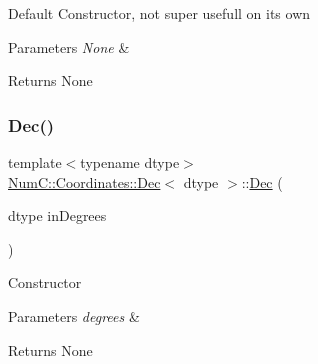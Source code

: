 Default Constructor, not super usefull on its own


\begin{DoxyParams}{Parameters}
{\em None} & \\
\hline
\end{DoxyParams}
\begin{DoxyReturn}{Returns}
None 
\end{DoxyReturn}
\mbox{\label{class_num_c_1_1_coordinates_1_1_dec_ab8907d7ea5bc9204aaef40371270be03}} 
\subsubsection{\texorpdfstring{Dec()}{Dec()}\hspace{0.1cm}{\footnotesize\ttfamily [2/3]}}
{\footnotesize\ttfamily template$<$typename dtype$>$ \\
\mbox{\hyperlink{class_num_c_1_1_coordinates_1_1_dec}{Num\+C\+::\+Coordinates\+::\+Dec}}$<$ dtype $>$\+::\mbox{\hyperlink{class_num_c_1_1_coordinates_1_1_dec}{Dec}} (\begin{DoxyParamCaption}\item[{dtype}]{in\+Degrees }\end{DoxyParamCaption})\hspace{0.3cm}{\ttfamily [inline]}}

Constructor


\begin{DoxyParams}{Parameters}
{\em degrees} & \\
\hline
\end{DoxyParams}
\begin{DoxyReturn}{Returns}
None 
\end{DoxyReturn}
\mbox{\label{class_num_c_1_1_coordinates_1_1_dec_a776298864c1fa18e61d81014adbecd07}} 
